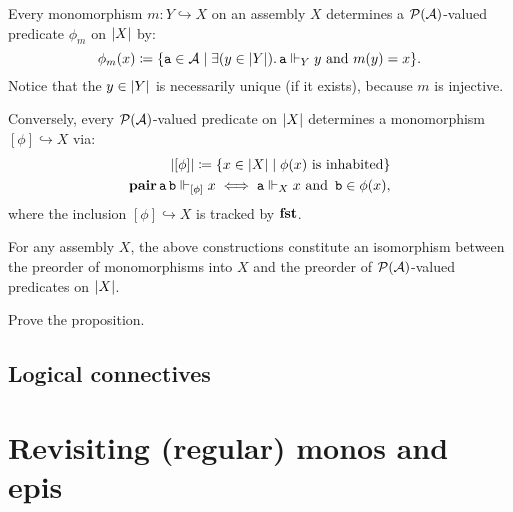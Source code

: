 Every monomorphism \(m \colon Y \hookrightarrow X\) on an assembly \(X\)
determines a \(\mathcal P(\mathcal A)\)-valued predicate \(\phi_m\) on \(\lvert X\rvert\) by:
\[
  \phi_m(x) \coloneqq \{\operatorname{\mathtt{a}} \in \mathcal A \mid
    \exists(y \in \lvert Y\rvert).\operatorname{\mathtt{a}} \Vdash_Y y \text{ and } m(y) = x\}.
\]
%
Notice that the \(y \in \lvert Y\rvert\) is necessarily unique (if it exists),
because \(m\) is injective.

Conversely, every \(\mathcal P(\mathcal A)\)-valued predicate on \(\lvert X\rvert\) determines a
monomorphism \([\phi] \hookrightarrow X\) via:
\begin{align*}
  \lvert[\phi]\rvert \coloneqq \{x \in \lvert X\rvert \mid \phi(x) \text{ is inhabited}\} \\
  \operatorname{\mathbf{pair}}\operatorname{\mathtt{a}}\operatorname{\mathtt{b}} \Vdash_{[\phi]} x
  \iff \operatorname{\mathtt{a}} \Vdash_X x
  \text{ and }
  \operatorname{\mathtt{b}} \in \phi(x),
\end{align*}
where the inclusion \([\phi] \hookrightarrow X\) is tracked by \(\operatorname{\mathbf{fst}}\).

\begin{proposition}
  For any assembly \(X\), the above constructions constitute an isomorphism
  between the preorder of monomorphisms into \(X\) and the preorder of
  \(\mathcal P(\mathcal A)\)-valued predicates on \(\lvert X\rvert\).
\end{proposition}
\begin{exercise}\label{exer:preorders-monos-predicates-iso}
  Prove the proposition.
\end{exercise}


\subsection{Logical connectives}


\section{Revisiting (regular) monos and epis}

